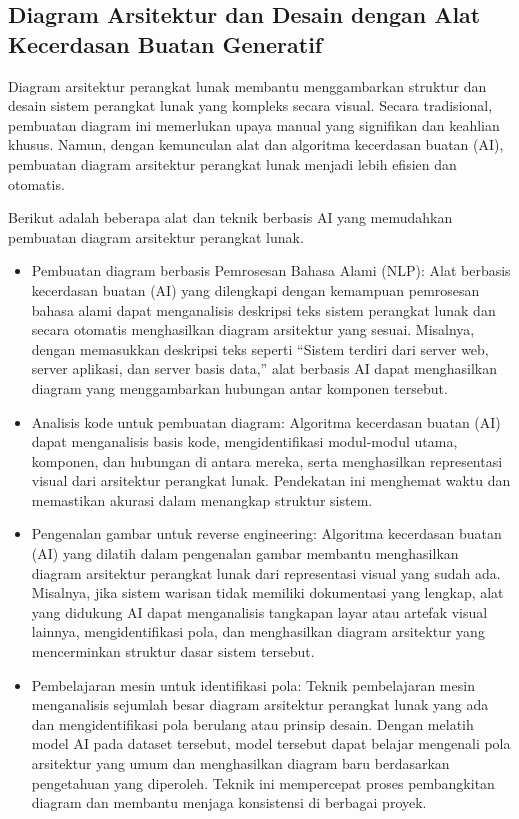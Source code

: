 \documentclass{article}
\begin{document}
\subsection{Diagram Arsitektur dan Desain dengan Alat Kecerdasan Buatan Generatif}
Diagram arsitektur perangkat lunak membantu menggambarkan struktur dan desain sistem perangkat lunak yang kompleks secara visual. Secara tradisional, pembuatan diagram ini memerlukan upaya manual yang signifikan dan keahlian khusus. Namun, dengan kemunculan alat dan algoritma kecerdasan buatan (AI), pembuatan diagram arsitektur perangkat lunak menjadi lebih efisien dan otomatis.

Berikut adalah beberapa alat dan teknik berbasis AI yang memudahkan pembuatan diagram arsitektur perangkat lunak.
\begin{itemize}
    \item Pembuatan diagram berbasis Pemrosesan Bahasa Alami (NLP): Alat berbasis kecerdasan buatan (AI) yang dilengkapi dengan kemampuan pemrosesan bahasa alami dapat menganalisis deskripsi teks sistem perangkat lunak dan secara otomatis menghasilkan diagram arsitektur yang sesuai. Misalnya, dengan memasukkan deskripsi teks seperti “Sistem terdiri dari server web, server aplikasi, dan server basis data,” alat berbasis AI dapat menghasilkan diagram yang menggambarkan hubungan antar komponen tersebut.
    \item Analisis kode untuk pembuatan diagram: Algoritma kecerdasan buatan (AI) dapat menganalisis basis kode, mengidentifikasi modul-modul utama, komponen, dan hubungan di antara mereka, serta menghasilkan representasi visual dari arsitektur perangkat lunak. Pendekatan ini menghemat waktu dan memastikan akurasi dalam menangkap struktur sistem.
    \item Pengenalan gambar untuk reverse engineering: Algoritma kecerdasan buatan (AI) yang dilatih dalam pengenalan gambar membantu menghasilkan diagram arsitektur perangkat lunak dari representasi visual yang sudah ada. Misalnya, jika sistem warisan tidak memiliki dokumentasi yang lengkap, alat yang didukung AI dapat menganalisis tangkapan layar atau artefak visual lainnya, mengidentifikasi pola, dan menghasilkan diagram arsitektur yang mencerminkan struktur dasar sistem tersebut.
    \item Pembelajaran mesin untuk identifikasi pola: Teknik pembelajaran mesin menganalisis sejumlah besar diagram arsitektur perangkat lunak yang ada dan mengidentifikasi pola berulang atau prinsip desain. Dengan melatih model AI pada dataset tersebut, model tersebut dapat belajar mengenali pola arsitektur yang umum dan menghasilkan diagram baru berdasarkan pengetahuan yang diperoleh. Teknik ini mempercepat proses pembangkitan diagram dan membantu menjaga konsistensi di berbagai proyek.

\end{itemize}
\end{document}
